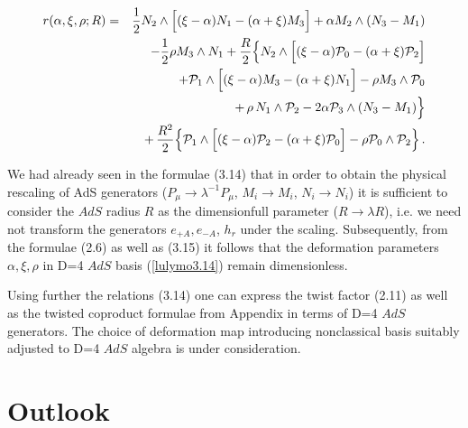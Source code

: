 \documentclass[a4paper,12pt,showkeys]{article}
\begin{document}
\begin{eqnarray}\label{lulymo3.16}
 r(\alpha, \xi, \rho; R)& = &\frac{1}{2} N_2 \wedge
  \Big[ (\xi -\alpha) N_1
 - (\alpha + \xi )M_3 \Big]
 +\alpha M_2 \wedge (N_3 - M_1 )
\cr
&&
  - \frac{1}{2}\rho M_3 \wedge N_1
 + \frac{R}{2}\Big\{ N_2 \wedge \Big[ (\xi -\alpha){\cal P}_0 -
(\alpha +\xi){\cal P}_2\Big]
\cr
&&
 + {\cal P}_1 \wedge \Big[(\xi-\alpha)M_3
 - (\alpha+\xi)N_1\Big]
- \rho
  M_3 \wedge {\cal P}_0
  \cr
  &&+ \, \rho\,  N_1 \wedge {\cal P}_2 - 2    \alpha {\cal P}_3
  \wedge (N_3 - M_1 )  \Big\}
\cr && + \, \frac{R^2}{2}\Big\{ {\cal P}_1 \wedge
\Big[(\xi-\alpha){\cal P}_2 -(\alpha+\xi){\cal P}_0\Big] - \rho
{\cal P}_0 \wedge {\cal P}_2 \Big\} \, .
\end{eqnarray}

We had already seen in the formulae (3.14) that in order to obtain the
physical rescaling of AdS generators
 ($P_{\mu} \longrightarrow \lambda^{-1}P_{\mu}$,
$M_i \longrightarrow M_i$, $N_i \longrightarrow N_i$) it is
sufficient to consider the $AdS$ radius $R$ as the dimensionfull
parameter ($R \longrightarrow \lambda R$),
 i.e. we need not
transform the generators $e_{+A},e_{-A}$, $h_r$ under the scaling.
Subsequently, from the formulae (2.6) as well as (3.15) it
follows that the deformation  parameters $\alpha, \xi, \rho$ in
D=4 $AdS$ basis (\ref{lulymo3.14}) remain dimensionless.

Using further the relations (3.14) one can express the twist
factor (2.11) as well as the twisted coproduct formulae from
 Appendix in terms of D=4 $AdS$ generators. The choice of
 deformation
  map introducing nonclassical basis
 suitably adjusted to D=4 $AdS$ algebra is under
 consideration.


\section{Outlook}
\setcounter{equation}{0}
\end{document}

